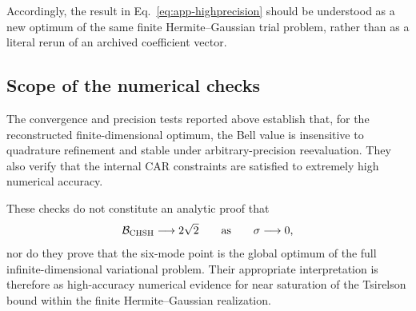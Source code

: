 \documentclass[11pt]{article}
\begin{document}
Accordingly, the result in Eq.~\eqref{eq:app-highprecision} should be understood
as a new optimum of the same finite Hermite--Gaussian trial problem, rather than
as a literal rerun of an archived coefficient vector.

\subsection{Scope of the numerical checks}

The convergence and precision tests reported above establish that, for the
reconstructed finite-dimensional optimum, the Bell value is insensitive to
quadrature refinement and stable under arbitrary-precision reevaluation. They
also verify that the internal CAR constraints are satisfied to extremely high
numerical accuracy.

These checks do not constitute an analytic proof that
\begin{equation}
\mathcal B_{\rm CHSH}\longrightarrow 2\sqrt{2}
\qquad
\text{as}
\qquad
\sigma\longrightarrow0,
\end{equation}
nor do they prove that the six-mode point is the global optimum of the full
infinite-dimensional variational problem. Their appropriate interpretation is
therefore as high-accuracy numerical evidence for near saturation of the
Tsirelson bound within the finite Hermite--Gaussian realization.
\end{document}
